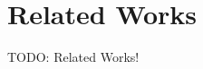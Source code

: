 \documentclass[../main.tex]{subfiles}
\begin{document}
\section{Related Works}
\label{sec:related_works}
TODO: Related Works!
\end{document}
